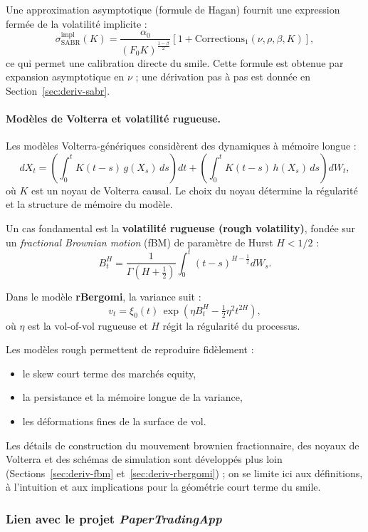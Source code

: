 \documentclass[11pt,a4paper]{article}
\newcommand{\1}{\mathbf{1}}
\begin{document}
Une approximation asymptotique (formule de Hagan) fournit une expression fermée de la
volatilité implicite :
\[
\sigma_{\mathrm{SABR}}^{\mathrm{impl}}(K)
=
\frac{\alpha_0}{(F_0 K)^{\frac{1-\beta}{2}}}
\left[ 1 + \text{Corrections}_1(\nu,\rho,\beta,K) \right],
\]
ce qui permet une calibration directe du smile. Cette formule est obtenue par expansion
asymptotique en $\nu$ ; une d\'erivation pas \`a pas est donn\'ee en Section~\ref{sec:deriv-sabr}.

\paragraph{Mod\`eles de Volterra et volatilité rugueuse.}

Les mod\`eles Volterra-g\'en\'eriques consid\`erent des dynamiques \`a m\'emoire
longue :
\[
dX_t
= \left( \int_0^t K(t-s)\,g(X_s)\,ds \right) dt
+ \left( \int_0^t K(t-s)\,h(X_s)\,ds \right) dW_t,
\]
o\`u $K$ est un noyau de Volterra causal. Le choix du noyau d\'etermine la
r\'egularité et la structure de m\'emoire du mod\`ele.

Un cas fondamental est la \textbf{volatilité rugueuse (rough volatility)}, fondée
sur un \emph{fractional Brownian motion} (fBM) de param\`etre de Hurst $H<1/2$ :
\[
B_t^H = \frac{1}{\Gamma(H+\frac12)}
\int_0^t (t-s)^{H-\frac12} dW_s.
\]

Dans le mod\`ele \textbf{rBergomi}, la variance suit :
\[
v_t = \xi_0(t)\,
\exp\!\left(\eta B_t^H - \tfrac12 \eta^2 t^{2H}\right),
\]
o\`u $\eta$ est la vol-of-vol rugueuse et $H$ r\'egit la r\'egularit\'e du
processus.

Les mod\`eles rough permettent de reproduire fid\`element :
\begin{itemize}
  \item le skew court terme des march\'es equity,
  \item la persistance et la m\'emoire longue de la variance,
  \item les d\'eformations fines de la surface de vol.
\end{itemize}

Les d\'etails de construction du mouvement brownien fractionnaire, des noyaux de Volterra et des sch\'emas de simulation
sont d\'evelopp\'es plus loin (Sections~\ref{sec:deriv-fbm} et~\ref{sec:deriv-rbergomi}) ; on se limite ici aux d\'efinitions,
\`a l'intuition et aux implications pour la g\'eom\'etrie court terme du smile.


\subsubsection{Lien avec le projet \emph{PaperTradingApp}}
\end{document}
